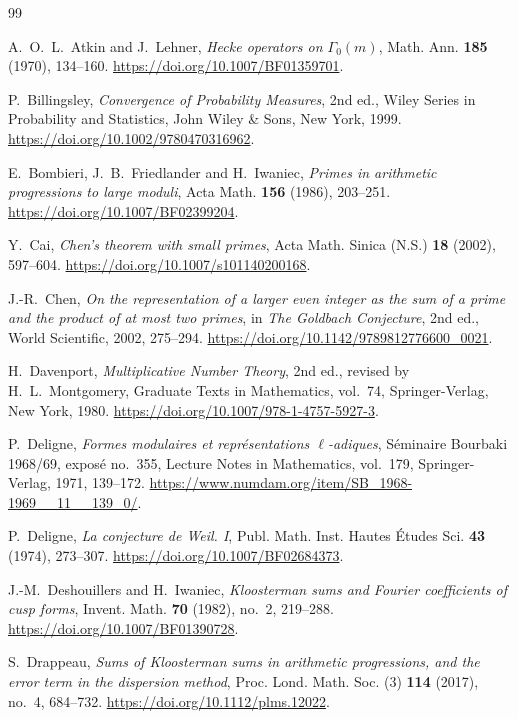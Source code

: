 \begin{thebibliography}{99}

A.~O.~L.~Atkin and J.~Lehner,
\emph{Hecke operators on $\Gamma_0(m)$},
Math. Ann. \textbf{185} (1970), 134--160.
\url{https://doi.org/10.1007/BF01359701}.

P.~Billingsley, \emph{Convergence of Probability Measures}, 2nd ed.,
Wiley Series in Probability and Statistics, John Wiley \& Sons, New York,
1999.
\url{https://doi.org/10.1002/9780470316962}.

E.~Bombieri, J.~B.~Friedlander and H.~Iwaniec,
\emph{Primes in arithmetic progressions to large moduli},
Acta Math. \textbf{156} (1986), 203--251.
\url{https://doi.org/10.1007/BF02399204}.

Y.~Cai, \emph{Chen's theorem with small primes},
Acta Math. Sinica (N.S.) \textbf{18} (2002), 597--604.
\url{https://doi.org/10.1007/s101140200168}.

J.-R.~Chen, \emph{On the representation of a larger even integer as the
sum of a prime and the product of at most two primes}, in
\emph{The Goldbach Conjecture}, 2nd ed., World Scientific, 2002, 275--294.
\url{https://doi.org/10.1142/9789812776600_0021}.

H.~Davenport, \emph{Multiplicative Number Theory}, 2nd ed.,
revised by H.~L.~Montgomery, Graduate Texts in Mathematics, vol.~74,
Springer-Verlag, New York, 1980.
\url{https://doi.org/10.1007/978-1-4757-5927-3}.

P.~Deligne, \emph{Formes modulaires et repr\'esentations $\ell$-adiques},
S\'eminaire Bourbaki 1968/69, expos\'e no.~355,
Lecture Notes in Mathematics, vol.~179, Springer-Verlag, 1971, 139--172.
\url{https://www.numdam.org/item/SB_1968-1969__11__139_0/}.

P.~Deligne, \emph{La conjecture de Weil. I},
Publ. Math. Inst. Hautes \'Etudes Sci. \textbf{43} (1974), 273--307.
\url{https://doi.org/10.1007/BF02684373}.

J.-M.~Deshouillers and H.~Iwaniec, \emph{Kloosterman sums and Fourier
coefficients of cusp forms}, Invent. Math. \textbf{70} (1982), no.~2, 219--288.
\url{https://doi.org/10.1007/BF01390728}.

S.~Drappeau, \emph{Sums of Kloosterman sums in arithmetic progressions, and
the error term in the dispersion method}, Proc. Lond. Math. Soc. (3)
\textbf{114} (2017), no.~4, 684--732.
\url{https://doi.org/10.1112/plms.12022}.


\end{thebibliography}
